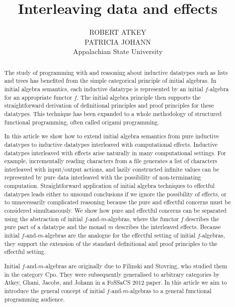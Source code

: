 \documentclass{jfp1}
\title{Interleaving data and effects}
\author[R. Atkey, P. Johann]
       {ROBERT ATKEY \\
         \vspace{1em}
         PATRICIA JOHANN \\
         Appalachian State University \\
         \email{bob.atkey@gmail.com, johannp@appstate.edu}}
\begin{document}
\label{firstpage}

\maketitle

\begin{abstract}
  The study of programming with and reasoning about inductive
  datatypes such as lists and trees has benefited from the simple
  categorical principle of initial algebras. In initial algebra
  semantics, each inductive datatype is represented by an initial
  $f$-algebra for an appropriate functor $f$. The initial algebra
  principle then supports the straightforward derivation of
  definitional principles and proof principles for these datatypes.
  This technique has been expanded to a whole methodology of
  structured functional programming, often called origami programming.

  In this article we show how to extend initial algebra semantics
  from pure inductive datatypes to inductive datatypes interleaved
  with computational effects. Inductive datatypes interleaved with
  effects arise naturally in many computational settings. For example,
  incrementally reading characters from a file generates a list of
  characters interleaved with input/output actions, and lazily
  constructed infinite values can be represented by pure data
  interleaved with the possibility of non-terminating
  computation. Straightforward application of initial algebra
  techniques to effectful datatypes leads either to unsound
  conclusions if we ignore the possibility of effects, or to
  unnecessarily complicated reasoning because the pure and effectful
  concerns must be considered simultaneously. We show how pure and
  effectful concerns can be separated using the abstraction of initial
  $f$-and-$m$-algebras, where the functor $f$ describes the pure part
  of a datatype and the monad $m$ describes the interleaved
  effects. Because initial $f$-and-$m$-algebras are the analogue for
  the effectful setting of initial $f$-algebras, they support the
  extension of the standard definitional and proof principles to the
  effectful setting.

  Initial $f$-and-$m$-algebras are originally due to Filinski and
  St\o{}vring, who studied them in the category Cpo. They were
  subsequently generalised to arbitrary categories by Atkey, Ghani,
  Jacobs, and Johann in a FoSSaCS 2012 paper. In this article we aim
  to introduce the general concept of initial $f$-and-$m$-algebras to
  a general functional programming audience.
\end{abstract}
\end{document}
